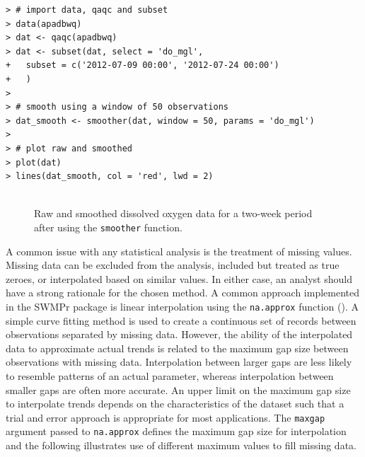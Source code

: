 \documentclass[10pt,letterpaper]{article}\usepackage[]{graphicx}\usepackage[]{color}
\makeatletter
\newenvironment{kframe}{%
 \def\at@end@of@kframe{}%
 \ifinner\ifhmode%
  \def\at@end@of@kframe{\end{minipage}}%
  \begin{minipage}{\columnwidth}%
 \fi\fi%
 \def\FrameCommand##1{\hskip\@totalleftmargin \hskip-\fboxsep
 \colorbox{shadecolor}{##1}\hskip-\fboxsep
     \hskip-\linewidth \hskip-\@totalleftmargin \hskip\columnwidth}%
 \MakeFramed {\advance\hsize-\width
   \@totalleftmargin\z@ \linewidth\hsize
   \@setminipage}}%
 {\par\unskip\endMakeFramed%
 \at@end@of@kframe}
\newenvironment{knitrout}{}{} %
\makeatother
\begin{document}
\begin{knitrout}\small
{}\color{fgcolor}\begin{kframe}
\begin{verbatim}
> # import data, qaqc and subset
> data(apadbwq)
> dat <- qaqc(apadbwq)
> dat <- subset(dat, select = 'do_mgl', 
+   subset = c('2012-07-09 00:00', '2012-07-24 00:00')
+   )
> 
> # smooth using a window of 50 observations
> dat_smooth <- smoother(dat, window = 50, params = 'do_mgl')
> 
> # plot raw and smoothed
> plot(dat)
> lines(dat_smooth, col = 'red', lwd = 2)
\end{verbatim}
\end{kframe}\begin{figure}[!h]

{\centering \includegraphics[width=0.00\textwidth]{figure/smooth_ex-1} 

}

\caption[Raw and smoothed dissolved oxygen data for a two-week period after using the \texttt{smoother} function]{Raw and smoothed dissolved oxygen data for a two-week period after using the \texttt{smoother} function.}\label{fig:smooth_ex}
\end{figure}


\end{knitrout}

A common issue with any statistical analysis is the treatment of missing values.  Missing data can be excluded from the analysis, included but treated as true zeroes, or interpolated based on similar values.  In either case, an analyst should have a strong rationale for the chosen method.  A common approach implemented in the SWMPr package is linear interpolation using the \texttt{na.approx} function ().  A simple curve fitting method is used to create a continuous set of records between observations separated by missing data.  However, the ability of the interpolated data to approximate actual trends is related to the maximum gap size between observations with missing data.  Interpolation between larger gaps are less likely to resemble patterns of an actual parameter, whereas interpolation between smaller gaps are often more accurate.  An upper limit on the maximum gap size to interpolate trends depends on the characteristics of the dataset such that a trial and error approach is appropriate for most applications.  The \texttt{maxgap} argument passed to \texttt{na.approx} defines the maximum gap size for interpolation and the following illustrates use of different maximum values to fill missing data.  
\end{document}

